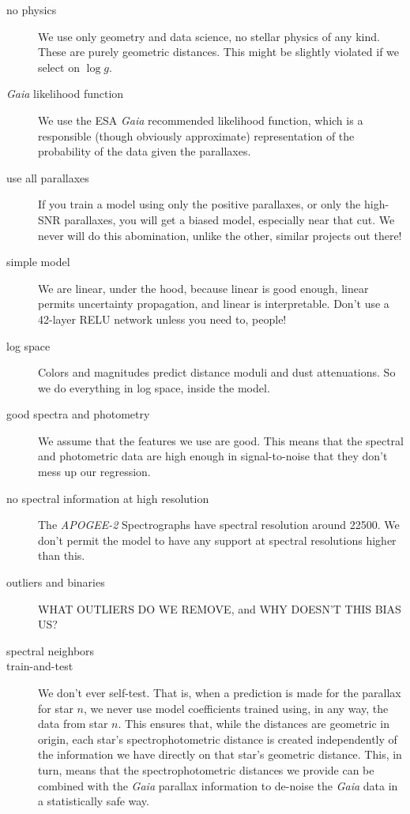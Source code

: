 \documentclass[modern]{aastex631}
\newcommand{\acronym}[1]{{\small{#1}}}
\newcommand{\project}[1]{\textsl{#1}}
\newcommand{\ESA}{\acronym{ESA}}
\newcommand{\Gaia}{\project{Gaia}}
\newcommand{\APOGEE}{\project{\acronym{APOGEE-2}}}
\begin{document}
\begin{description}
\item[no physics] We use only geometry and data science, no stellar physics
  of any kind. These are purely geometric distances. This might be slightly
  violated if we select on $\log g$.
\item[\Gaia{} likelihood function] We use the \ESA{} \Gaia{}
  recommended likelihood function, which is a responsible (though obviously
  approximate) representation of the probability of the data given the
  parallaxes.
\item[use all parallaxes] If you train a model using only the positive
  parallaxes, or only the high-SNR parallaxes, you will get a biased model,
  especially near that cut. We never will do this abomination, unlike the
  other, similar projects out there!
\item[simple model] We are linear, under the hood, because linear is good enough,
  linear permits uncertainty propagation, and linear is interpretable. Don't use
  a 42-layer RELU network unless you need to, people!
\item[log space] Colors and magnitudes predict distance moduli and
  dust attenuations. So we do everything in log space, inside the
  model.
\item[good spectra and photometry] We assume that the features we use are
  good. This means that the spectral and photometric data are high enough in
  signal-to-noise that they don't mess up our regression.
\item[no spectral information at high resolution] The \APOGEE{} Spectrographs
  have spectral resolution around 22500. We don't permit the model to have any
  support at spectral resolutions higher than this.
\item[outliers and binaries] WHAT OUTLIERS DO WE REMOVE, and WHY DOESN'T THIS BIAS US?
\item[spectral neighbors]
\item[train-and-test] We don't ever self-test. That is, when a prediction is
  made for the parallax for star $n$, we never use model coefficients trained
  using, in any way, the data from star $n$.
  This ensures that, while the distances are geometric in origin, each star's
  spectrophotometric distance is created
  independently of the information we have directly on that star's
  geometric distance. This, in turn, means that the spectrophotometric distances
  we provide can be combined with the \Gaia{} parallax information to de-noise
  the \Gaia{} data in a statistically safe way.
\end{description}
\end{document}
